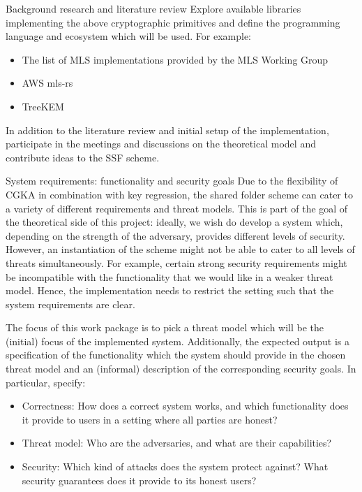 \documentclass[E]{BAMASA}
\begin{document}
\begin{workpackage}{Background research and literature review}
Explore available libraries implementing the above cryptographic primitives and define the programming language and ecosystem which will be used. 
For example:
\begin{itemize}
    \item The list of MLS implementations provided by the MLS Working Group~\cite{MLSWGimpl}
    \item AWS mls-rs~\cite{AWSMLSrs}
    \item TreeKEM~\cite{TreeKEMimpl}
\end{itemize}

In addition to the literature review and initial setup of the implementation, participate in the meetings and discussions on the theoretical model and contribute ideas to the SSF scheme.

\end{workpackage}

\begin{workpackage}{System requirements: functionality and security goals}\label{wp:system-reqs}
    Due to the flexibility of CGKA in combination with key regression, the shared folder scheme can cater to a variety of different requirements and threat models.
    This is part of the goal of the theoretical side of this project: 
    ideally, we wish do develop a system which, depending on the strength of the adversary, provides different levels of security.
    However, an instantiation of the scheme might not be able to cater to all levels of threats simultaneously.
    For example, certain strong security requirements might be incompatible with the functionality that we would like in a weaker threat model.
    Hence, the implementation needs to restrict the setting such that the system requirements are clear.
    
    The focus of this work package is to pick a threat model which will be the (initial) focus of the implemented system.
    Additionally, the expected output is a specification of the functionality which the system should provide in the chosen threat model and an (informal) description of the corresponding security goals.
    In particular, specify:
    \begin{itemize}
        \item Correctness: How does a correct system works, and which functionality does it provide to users in a setting where all parties are honest?
        \item Threat model: Who are the adversaries, and what are their capabilities?
        \item Security: Which kind of attacks does the system protect against? What security guarantees does it provide to its honest users?
    \end{itemize}
\end{workpackage}
\end{document}
